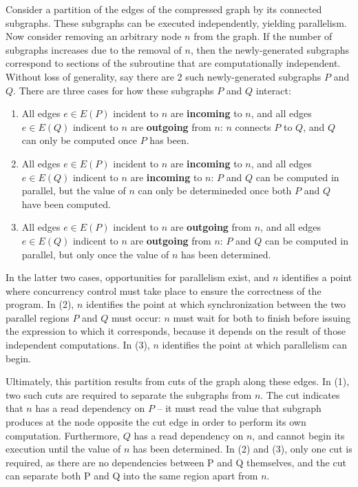 Consider a partition of the edges of the compressed graph by its connected
subgraphs. These subgraphs can be executed independently, yielding parallelism.
Now consider removing an arbitrary node $n$ from the graph. If the number of
subgraphs increases due to the removal of $n$, then the newly-generated
subgraphs correspond to sections of the subroutine that are computationally
independent. Without loss of generality, say there are 2 such newly-generated
subgraphs $P$ and $Q$. There are three cases for how these subgraphs $P$ and $Q$
interact:
\begin{enumerate}
    \item All edges $e \in E(P)$ incident to $n$ are \textbf{incoming} to $n$,
        and all edges $e \in E(Q)$ indicent to $n$ are \textbf{outgoing} from
        $n$: $n$ connects $P$ to $Q$, and $Q$ can only be computed once $P$ has
        been.
    \item All edges $e \in E(P)$ incident to $n$ are \textbf{incoming} to $n$,
        and all edges $e \in E(Q)$ indicent to $n$ are \textbf{incoming} to $n$:
        $P$ and $Q$ can be computed in parallel, but the value of $n$ can only
        be determineded once both $P$ and $Q$ have been computed.
    \item All edges $e \in E(P)$ incident to $n$ are \textbf{outgoing} from $n$,
        and all edges $e \in E(Q)$ indicent to $n$ are \textbf{outgoing} from
        $n$: $P$ and $Q$ can be computed in parallel, but only once the value of
        $n$ has been determined.
\end{enumerate}

In the latter two cases, opportunities for parallelism exist, and $n$ identifies
a point where concurrency control must take place to ensure the correctness of
the program. In (2), $n$ identifies the point at which synchronization between
the two parallel regions $P$ and $Q$ must occur: $n$ must wait for both to
finish before issuing the expression to which it corresponds, because it depends
on the result of those independent computations. In (3), $n$ identifies the
point at which parallelism can begin.

Ultimately, this partition results from cuts of the graph along these edges. In
(1), two such cuts are required to separate the subgraphs from $n$. The cut
indicates that $n$ has a read dependency on $P$ -- it must read the value that
subgraph produces at the node opposite the cut edge in order to perform its own
computation. Furthermore, $Q$ has a read dependency on $n$, and cannot begin its
execution until the value of $n$ has been determined. In (2) and (3), only one
cut is required, as there are no dependencies between P and Q themselves, and
the cut can separate both P and Q into the same region apart from $n$.

